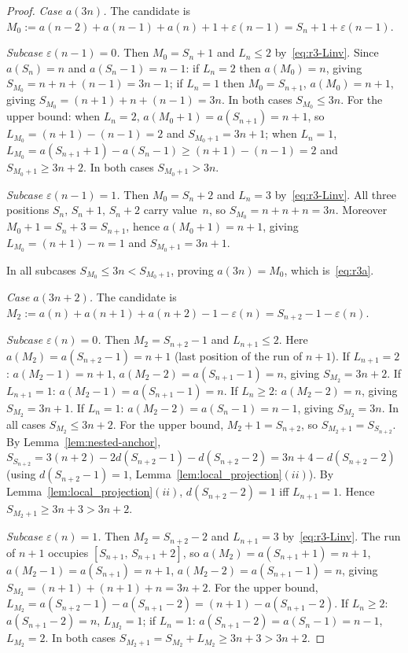 \documentclass[10pt,a4paper]{amsart}
\begin{document}
\begin{proof}
\textit{Case $a(3n)$.}
The candidate is $M_0:=a(n-2)+a(n-1)+a(n)+1+\varepsilon(n-1)=S_n+1+\varepsilon(n-1)$.

\textit{Subcase $\varepsilon(n-1)=0$.}
Then $M_0=S_n+1$ and $L_n\le 2$ by~\eqref{eq:r3-Linv}.
Since $a(S_n)=n$ and $a(S_n-1)=n-1$:
if $L_n=2$ then $a(M_0)=n$, giving
$S_{M_0}=n+n+(n-1)=3n-1$;
if $L_n=1$ then $M_0=S_{n+1}$, $a(M_0)=n+1$, giving
$S_{M_0}=(n+1)+n+(n-1)=3n$.
In both cases $S_{M_0}\le 3n$.
For the upper bound: when $L_n=2$,
$a(M_0+1)=a(S_{n+1})=n+1$, so $L_{M_0}=(n+1)-(n-1)=2$
and $S_{M_0+1}=3n+1$;
when $L_n=1$,
$L_{M_0}=a(S_{n+1}+1)-a(S_n-1)\ge(n+1)-(n-1)=2$
and $S_{M_0+1}\ge 3n+2$.
In both cases $S_{M_0+1}>3n$.

\textit{Subcase $\varepsilon(n-1)=1$.}
Then $M_0=S_n+2$ and $L_n=3$ by~\eqref{eq:r3-Linv}.
All three positions $S_n,\,S_n+1,\,S_n+2$ carry value~$n$, so
$S_{M_0}=n+n+n=3n$.
Moreover $M_0+1=S_n+3=S_{n+1}$, hence $a(M_0+1)=n+1$,
giving $L_{M_0}=(n+1)-n=1$ and $S_{M_0+1}=3n+1$.

In all subcases $S_{M_0}\le 3n<S_{M_0+1}$,
proving $a(3n)=M_0$, which is~\eqref{eq:r3a}.

\textit{Case $a(3n+2)$.}
The candidate is $M_2:=a(n)+a(n+1)+a(n+2)-1-\varepsilon(n)=S_{n+2}-1-\varepsilon(n)$.

\textit{Subcase $\varepsilon(n)=0$.}
Then $M_2=S_{n+2}-1$ and $L_{n+1}\le 2$.
Here $a(M_2)=a(S_{n+2}-1)=n+1$ (last position of the run of $n+1$).
If $L_{n+1}=2$: $a(M_2-1)=n+1$, $a(M_2-2)=a(S_{n+1}-1)=n$,
giving $S_{M_2}=3n+2$.
If $L_{n+1}=1$: $a(M_2-1)=a(S_{n+1}-1)=n$.
\quad If $L_n\ge 2$: $a(M_2-2)=n$, giving $S_{M_2}=3n+1$.
\quad If $L_n=1$: $a(M_2-2)=a(S_n-1)=n-1$, giving $S_{M_2}=3n$.
In all cases $S_{M_2}\le 3n+2$.
For the upper bound, $M_2+1=S_{n+2}$, so
$S_{M_2+1}=S_{S_{n+2}}$.
By Lemma~\ref{lem:nested-anchor},
$S_{S_{n+2}}=3(n+2)-2d(S_{n+2}-1)-d(S_{n+2}-2)=3n+4-d(S_{n+2}-2)$
(using $d(S_{n+2}-1)=1$, Lemma~\ref{lem:local_projection}$(ii)$).
By Lemma~\ref{lem:local_projection}$(ii)$, $d(S_{n+2}-2)=1$
iff $L_{n+1}=1$.
Hence $S_{M_2+1}\ge 3n+3>3n+2$.

\textit{Subcase $\varepsilon(n)=1$.}
Then $M_2=S_{n+2}-2$ and $L_{n+1}=3$ by~\eqref{eq:r3-Linv}.
The run of $n+1$ occupies $[S_{n+1},\,S_{n+1}+2]$, so
$a(M_2)=a(S_{n+1}+1)=n+1$,
$a(M_2-1)=a(S_{n+1})=n+1$,
$a(M_2-2)=a(S_{n+1}-1)=n$,
giving $S_{M_2}=(n+1)+(n+1)+n=3n+2$.
For the upper bound,
$L_{M_2}=a(S_{n+2}-1)-a(S_{n+1}-2)=(n+1)-a(S_{n+1}-2)$.
If $L_n\ge 2$: $a(S_{n+1}-2)=n$, $L_{M_2}=1$;
if $L_n=1$: $a(S_{n+1}-2)=a(S_n-1)=n-1$, $L_{M_2}=2$.
In both cases $S_{M_2+1}=S_{M_2}+L_{M_2}\ge 3n+3>3n+2$.


\end{proof}
\end{document}
